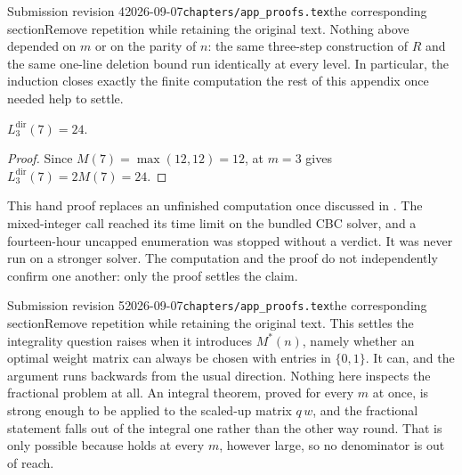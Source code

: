 \begin{offcut}{Submission revision 4}{2026-09-07}{\texttt{chapters/app\_proofs.tex}}{the corresponding section}{Remove repetition while retaining the original text.}
Nothing above depended on $m$ or on the parity of $n$: the same three-step construction of $R$ and the same one-line deletion bound run identically at every level. In particular, the induction closes exactly the finite computation the rest of this appendix once needed help to settle.

\begin{corollary}[The directed multigraph value at $n = 7$, $m = 3$,\aimedal]
$L_3^{\mathrm{dir}}(7) = 24$.
\end{corollary}

\begin{proof}
Since $M(7) = \max(12,12) = 12$,  at $m = 3$ gives
$L_3^{\mathrm{dir}}(7) = 2M(7) = 24$.
\end{proof}

This hand proof replaces an unfinished computation once discussed in
. The mixed-integer call
 reached its time limit on the
bundled CBC solver, and a fourteen-hour uncapped enumeration was stopped
without a verdict. It was never run on a stronger solver. The computation and
the proof do not independently confirm one another: only the proof settles the
claim.


\end{offcut}

\begin{offcut}{Submission revision 5}{2026-09-07}{\texttt{chapters/app\_proofs.tex}}{the corresponding section}{Remove repetition while retaining the original text.}
This settles the integrality question  raises when it introduces $M^{*}(n)$, namely whether an optimal weight matrix can always be chosen with entries in $\{0,1\}$. It can, and the argument runs backwards from the usual direction. Nothing here inspects the fractional problem at all. An integral theorem, proved for every $m$ at once, is strong enough to be applied to the scaled-up matrix $q\,w$, and the fractional statement falls out of the integral one rather than the other way round. That is only possible because  holds at every $m$, however large, so no denominator is out of reach.


\end{offcut}

